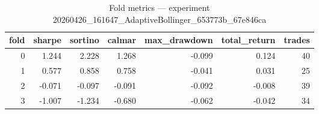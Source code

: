 \begin{table}
\caption{Fold metrics — experiment 20260426_161647_AdaptiveBollinger_653773b_67e846ca}
\label{tab:metrics_20260426_161647_AdaptiveBollinger_653773b_67e846ca}
\begin{tabular}{rrrrrrr}
\toprule
fold & sharpe & sortino & calmar & max_drawdown & total_return & trades \\
\midrule
0 & 1.244 & 2.228 & 1.268 & -0.099 & 0.124 & 40 \\
1 & 0.577 & 0.858 & 0.758 & -0.041 & 0.031 & 25 \\
2 & -0.071 & -0.097 & -0.091 & -0.092 & -0.008 & 39 \\
3 & -1.007 & -1.234 & -0.680 & -0.062 & -0.042 & 34 \\
\bottomrule
\end{tabular}
\end{table}
